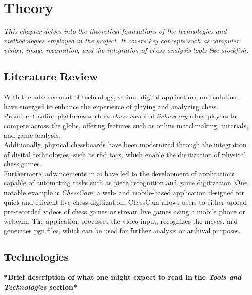 \chapter{Theory}
\label{chp:theory}

\begin{center}
    \textit{This chapter delves into the theoretical foundations of the technologies and methodologies employed in the project. It covers key concepts such as computer vision, image recognition, and the integration of chess analysis tools like \Gls{stockfish}.}    
\end{center}

\section{Literature Review}
\label{sec:literature-review}

With the advancement of technology, various digital applications and solutions have emerged to enhance the experience of playing and analyzing chess. Prominent online platforms such as \textit{chess.com} and \textit{lichess.org} allow players to compete across the globe, offering features such as online matchmaking, tutorials, and game analysis. \\
Additionally, physical chessboards have been modernized through the integration of digital technologies, such as \gls{rfid} tags, which enable the digitization of physical chess games. \cite{quora:shah} \\

Furthermore, advancements in \gls{ai} have led to the development of applications capable of automating tasks such as piece recognition and game digitization. One notable example is \textit{ChessCam}, a web- and mobile-based application designed for quick and efficient live chess digitization. ChessCam allows users to either upload pre-recorded videos of chess games or stream live games using a mobile phone or webcam. The application processes the video input, recognizes the moves, and generates \gls{pgn} files, which can be used for further analysis or archival purposes.

\section{Technologies}
\label{sec:technologies}

\textbf{*Brief description of what one might expect to read in the \textit{Tools and Technologies} section*}

